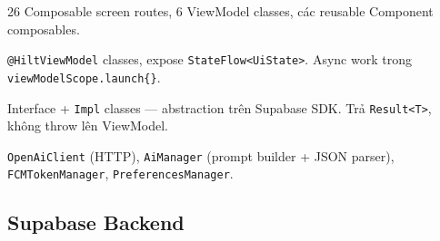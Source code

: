 \documentclass[12pt,a4paper]{article}
\begin{document}
\begin{description}[leftmargin=2cm]
  \item[\textbf{UI Layer}] 26 Composable screen routes, 6 ViewModel classes, các
        reusable Component composables.
  \item[\textbf{ViewModel Layer}] \texttt{@HiltViewModel} classes, expose
        \texttt{StateFlow<UiState>}. Async work trong \texttt{viewModelScope.launch\{\}}.
  \item[\textbf{Repository Layer}] Interface + \texttt{Impl} classes — abstraction trên
        Supabase SDK. Trả \texttt{Result<T>}, không throw lên ViewModel.
  \item[\textbf{Remote / Manager Layer}] \texttt{OpenAiClient} (HTTP), \texttt{AiManager}
        (prompt builder + JSON parser), \texttt{FCMTokenManager}, \texttt{PreferencesManager}.
\end{description}

\subsection{Supabase Backend}
\end{document}
